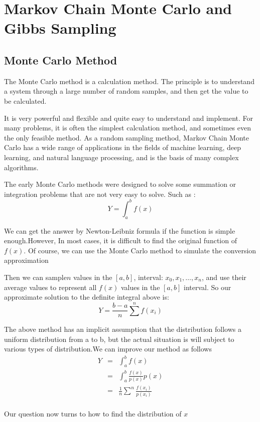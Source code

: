 \section{Markov Chain Monte Carlo and Gibbs Sampling}\label{bases}

\subsection{Monte Carlo Method}
The Monte Carlo method is a calculation method. The principle is to understand a system through a large number of random samples, and then get the value to be calculated.

It is very powerful and flexible and  quite easy to understand and  implement. For many problems, it is often the simplest calculation method, and sometimes even the only feasible method.
As a random sampling method, Markov Chain Monte Carlo has a wide range of applications in the fields of machine learning, deep learning, and natural language processing, and is the basis of many complex algorithms.

The early Monte Carlo methods were designed to solve some summation or integration problems that are not very easy to solve. Such as :
\[
Y = \int_a^b f(x)

\]

We can get the answer by Newton-Leibniz formula if the function is simple enough.However,
In most cases, it is difficult to find the original function of $f(x)$. Of course, we can use the Monte Carlo method to simulate the conversion approximation

Then we can sample$n$ values ​​in the $[a,b]$, interval: $x_0,x_1,\dots,x_n$, and use their average values ​​to represent all $f(x)$ values ​​in the $[a,b]$ interval. So our approximate solution to the definite integral above is:
\[
  Y = \frac{b-a}{n}\sum^n f(x_i)
\]

The above method has an implicit assumption that the distribution follows a uniform distribution from a to b, but the actual situation is will subject to  various types of distribution.We can improve our method as follows
\begin{eqnarray*}
Y &=& \int_a^b f(x) \\
  &=& \int_a^b \frac{f(x)}{p(x)}p(x) \\
  &=& \frac{1}{n} \sum^n \frac{f(x_i)}{p(x_i)}\\
\end{eqnarray*}

Our question now turns to how to find the distribution of $x$
